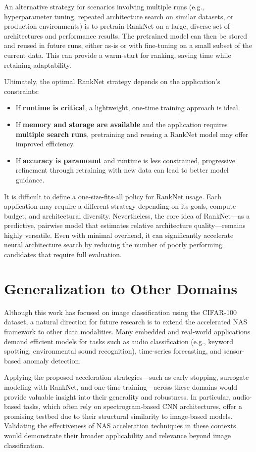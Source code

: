 An alternative strategy for scenarios involving multiple runs (e.g., hyperparameter tuning, repeated architecture search on similar datasets, or production environments) is to pretrain RankNet on a large, diverse set of architectures and performance results. The pretrained model can then be stored and reused in future runs, either as-is or with fine-tuning on a small subset of the current data. This can provide a warm-start for ranking, saving time while retaining adaptability.

Ultimately, the optimal RankNet strategy depends on the application's constraints:
\begin{itemize}
    \item If \textbf{runtime is critical}, a lightweight, one-time training approach is ideal.
    \item If \textbf{memory and storage are available} and the application requires \textbf{multiple search runs}, pretraining and reusing a RankNet model may offer improved efficiency.
    \item If \textbf{accuracy is paramount} and runtime is less constrained, progressive refinement through retraining with new data can lead to better model guidance.
\end{itemize}

It is difficult to define a one-size-fits-all policy for RankNet usage. Each application may require a different strategy depending on its goals, compute budget, and architectural diversity. Nevertheless, the core idea of RankNet—as a predictive, pairwise model that estimates relative architecture quality—remains highly versatile. Even with minimal overhead, it can significantly accelerate neural architecture search by reducing the number of poorly performing candidates that require full evaluation.

\section{Generalization to Other Domains}

Although this work has focused on image classification using the CIFAR-100 dataset, a natural direction for future research is to extend the accelerated NAS framework to other data modalities. Many embedded and real-world applications demand efficient models for tasks such as audio classification (e.g., keyword spotting, environmental sound recognition), time-series forecasting, and sensor-based anomaly detection.

Applying the proposed acceleration strategies—such as early stopping, surrogate modeling with RankNet, and one-time training—across these domains would provide valuable insight into their generality and robustness. In particular, audio-based tasks, which often rely on spectrogram-based CNN architectures, offer a promising testbed due to their structural similarity to image-based models. Validating the effectiveness of NAS acceleration techniques in these contexts would demonstrate their broader applicability and relevance beyond image classification.


